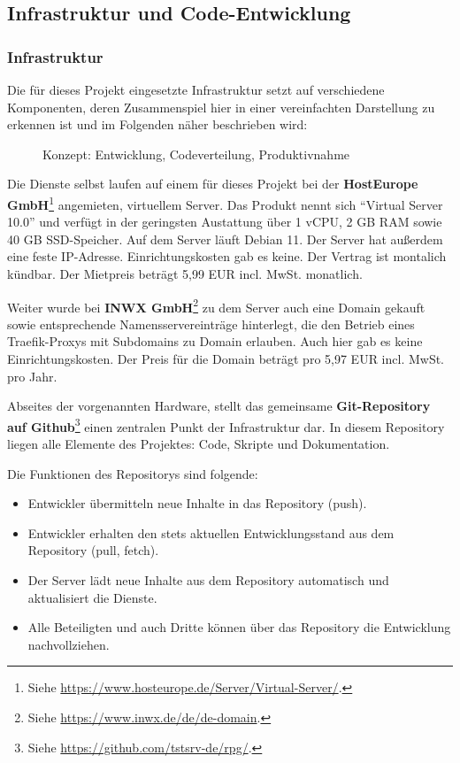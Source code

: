 
\subsection{Infrastruktur und Code-Entwicklung}


\subsubsection{Infrastruktur}

Die für dieses Projekt eingesetzte Infrastruktur setzt auf verschiedene Komponenten, deren Zusammenspiel hier in einer vereinfachten Darstellung zu erkennen ist und im Folgenden näher beschrieben wird: 

\begin{figure}[H]
    \centering
    \label{fig:henning-dia-git-dev-server}
    \caption{Konzept: Entwicklung, Codeverteilung, Produktivnahme}
\end{figure}


Die Dienste selbst laufen auf einem für dieses Projekt bei der \textbf{HostEurope GmbH}\footnote{Siehe \url{https://www.hosteurope.de/Server/Virtual-Server/}.} angemieten, virtuellem Server. Das Produkt nennt sich \enquote{Virtual Server 10.0} und verfügt in der geringsten Austattung über 1 vCPU, 2 GB RAM sowie 40 GB SSD-Speicher. Auf dem Server läuft Debian 11. Der Server hat außerdem eine feste IP-Adresse. Einrichtungskosten gab es keine. Der Vertrag ist montalich kündbar. Der Mietpreis beträgt 5,99 EUR incl. MwSt. monatlich.

Weiter wurde bei \textbf{INWX GmbH}\footnote{Siehe \url{https://www.inwx.de/de/de-domain}.} zu dem Server auch eine Domain gekauft sowie entsprechende Namensservereinträge hinterlegt, die den Betrieb eines Traefik-Proxys mit Subdomains zu Domain erlauben. Auch hier gab es keine Einrichtungskosten. Der Preis für die Domain beträgt pro 5,97 EUR incl. MwSt. pro Jahr. 


Abseites der vorgenannten Hardware, stellt das gemeinsame \textbf{Git-Repository auf Github}\footnote{Siehe \url{https://github.com/tstsrv-de/rpg/}.} einen zentralen Punkt der Infrastruktur dar. In diesem Repository liegen alle Elemente des Projektes: Code, Skripte und Dokumentation.

Die Funktionen des Repositorys sind folgende: \begin{itemize}
    \item Entwickler übermitteln neue Inhalte in das Repository (push).
    \item Entwickler erhalten den stets aktuellen Entwicklungsstand aus dem Repository (pull, fetch).
    \item Der Server lädt neue Inhalte aus dem Repository automatisch und aktualisiert die Dienste.
    \item Alle Beteiligten und auch Dritte können über das Repository die Entwicklung nachvollziehen. 
\end{itemize}


